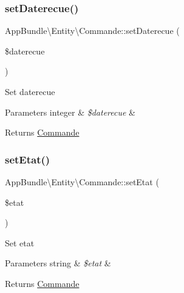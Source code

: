 \subsubsection{\texorpdfstring{set\+Daterecue()}{setDaterecue()}}
{\footnotesize\ttfamily App\+Bundle\textbackslash{}\+Entity\textbackslash{}\+Commande\+::set\+Daterecue (\begin{DoxyParamCaption}\item[{}]{\$daterecue }\end{DoxyParamCaption})}

Set daterecue


\begin{DoxyParams}[1]{Parameters}
integer & {\em \$daterecue} & \\
\hline
\end{DoxyParams}
\begin{DoxyReturn}{Returns}
\hyperlink{class_app_bundle_1_1_entity_1_1_commande}{Commande} 
\end{DoxyReturn}
\mbox{\label{class_app_bundle_1_1_entity_1_1_commande_abe8f50608638c791bb949720f2b7ef1a}} 
\subsubsection{\texorpdfstring{set\+Etat()}{setEtat()}}
{\footnotesize\ttfamily App\+Bundle\textbackslash{}\+Entity\textbackslash{}\+Commande\+::set\+Etat (\begin{DoxyParamCaption}\item[{}]{\$etat }\end{DoxyParamCaption})}

Set etat


\begin{DoxyParams}[1]{Parameters}
string & {\em \$etat} & \\
\hline
\end{DoxyParams}
\begin{DoxyReturn}{Returns}
\hyperlink{class_app_bundle_1_1_entity_1_1_commande}{Commande} 
\end{DoxyReturn}
\mbox{\label{class_app_bundle_1_1_entity_1_1_commande_ab06e927d69aeb2c0c1d9dbf10ebd7182}} 
